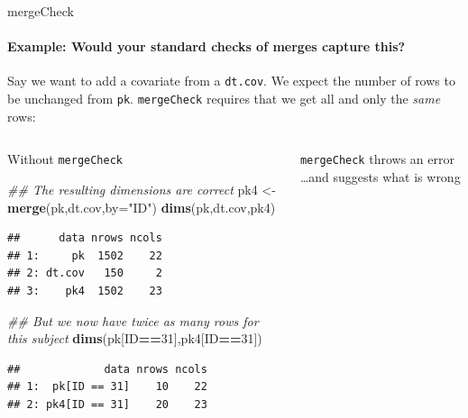 \documentclass[
  8pt,
  ignorenonframetext,
  aspectratio=169]{beamer}
\newenvironment{Shaded}{\begin{snugshade}}{\end{snugshade}}
\newcommand{\CommentTok}[1]{\textcolor[rgb]{0.56,0.35,0.01}{\textit{#1}}}
\newcommand{\DataTypeTok}[1]{\textcolor[rgb]{0.13,0.29,0.53}{#1}}
\newcommand{\DecValTok}[1]{\textcolor[rgb]{0.00,0.00,0.81}{#1}}
\newcommand{\KeywordTok}[1]{\textcolor[rgb]{0.13,0.29,0.53}{\textbf{#1}}}
\newcommand{\NormalTok}[1]{#1}
\newcommand{\OperatorTok}[1]{\textcolor[rgb]{0.81,0.36,0.00}{\textbf{#1}}}
\newcommand{\StringTok}[1]{\textcolor[rgb]{0.31,0.60,0.02}{#1}}
\begin{document}
\begin{frame}[fragile]{mergeCheck}
\protect\hypertarget{mergecheck}{}
\framesubtitle{Example: Would your standard checks of merges capture this?}

Say we want to add a covariate from a \texttt{dt.cov}. We expect the
number of rows to be unchanged from \texttt{pk}. \texttt{mergeCheck}
requires that we get all and only the \emph{same} rows:

\begin{columns}[T]
\begin{column}{0.48\textwidth}
\begin{block}{Without \texttt{mergeCheck}}
\protect\hypertarget{without-mergecheck}{}
\footnotesize

\begin{Shaded}
\begin{Highlighting}[]
\CommentTok{\#\# The resulting dimensions are correct}
\NormalTok{pk4 \textless{}{-}}\StringTok{ }\KeywordTok{merge}\NormalTok{(pk,dt.cov,}\DataTypeTok{by=}\StringTok{"ID"}\NormalTok{)}
\KeywordTok{dims}\NormalTok{(pk,dt.cov,pk4)}
\end{Highlighting}
\end{Shaded}

\begin{verbatim}
##      data nrows ncols
## 1:     pk  1502    22
## 2: dt.cov   150     2
## 3:    pk4  1502    23
\end{verbatim}

\begin{Shaded}
\begin{Highlighting}[]
\CommentTok{\#\# But we now have twice as many rows for this subject}
\KeywordTok{dims}\NormalTok{(pk[ID}\OperatorTok{==}\DecValTok{31}\NormalTok{],pk4[ID}\OperatorTok{==}\DecValTok{31}\NormalTok{])}
\end{Highlighting}
\end{Shaded}

\begin{verbatim}
##             data nrows ncols
## 1:  pk[ID == 31]    10    22
## 2: pk4[ID == 31]    20    23
\end{verbatim}
\end{block}
\end{column}

\begin{column}{0.48\textwidth}
\begin{block}{\texttt{mergeCheck} throws an error}
\protect\hypertarget{mergecheck-throws-an-error}{}
\ldots and suggests what is wrong \footnotesize


\end{block}
\end{column}
\end{columns}
\end{frame}
\end{document}
